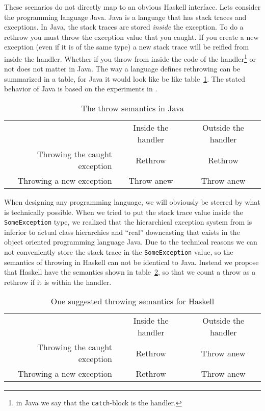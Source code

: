 These scenarios do not directly map to an obvious Haskell
interface. Lets consider the programming language Java. Java is a
language that has stack traces and exceptions. In Java, the stack traces
are stored \emph{inside} the exception. To do a rethrow you must throw
the exception value that you caught. If you create a new exception (even
if it is of the same type) a new stack trace will be reified from inside
the handler. Whether if you throw from inside the code of the
handler\footnote{in Java we say that the \texttt{catch}-block is the handler.}
or not does not matter in Java. The way a language defines rethrowing can be summarized
in a table, for Java it would look like be like table~\ref{tab:java_throw_semantics}. The
stated behavior of Java is based on the experiments in \cite{github_gist_in_out_java}.

\begin{table}[t]
  \centering
  \begin{tabular}{r|c|c|}
    \multicolumn{1}{r}{}
    &  \multicolumn{1}{c}{Inside the handler}
    & \multicolumn{1}{c}{Outside the handler} \\
    \cline{2-3}
    Throwing the caught exception & Rethrow    & Rethrow \\
    \cline{2-3}
    Throwing a new exception      & Throw anew & Throw anew \\
    \cline{2-3}
  \end{tabular}
  \caption{The throw semantics in Java}
  \label{tab:java_throw_semantics}
\end{table}

When designing any programming language, we will obviously be steered by
what is technically possible. When we tried to put the stack trace value
inside the \texttt{SomeException} type, we realized that the
hierarchical exception system from \cite{marlow2006extensible} is
inferior to actual class hierarchies and ``real'' downcasting that exists in the
object oriented programming language Java. Due to the technical reasons
we can not conveniently store the stack trace in the
\texttt{SomeException} value, so the semantics of throwing in Haskell
can not be identical to Java. Instead we propose that Haskell have the
semantics shown in table~\ref{tab:haskell_throw_semantics}, so that we count a throw as a rethrow if
it is within the handler.

\begin{table}[t]
  \centering
  \begin{tabular}{r|c|c|}
    \multicolumn{1}{r}{}
    &  \multicolumn{1}{c}{Inside the handler}
    & \multicolumn{1}{c}{Outside the handler} \\
    \cline{2-3}
    Throwing the caught exception & Rethrow & Throw anew \\
    \cline{2-3}
    Throwing a new exception      & Rethrow & Throw anew \\
    \cline{2-3}
  \end{tabular}
  \caption{One suggested throwing semantics for Haskell}
  \label{tab:haskell_throw_semantics}
\end{table}


